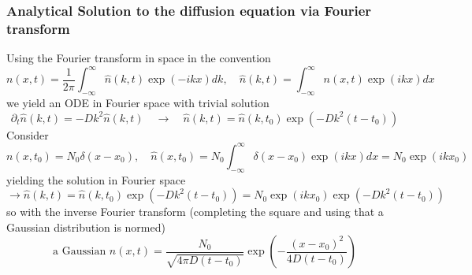 \subsubsection{Analytical Solution to the diffusion equation via Fourier transform}
Using the Fourier transform in space in the convention
\begin{equation}
    n(x, t)=\frac{1}{2 \pi} \int_{-\infty}^{\infty} \hat{n}(k, t) \exp (-i k x) d k, \quad \hat{n}(k, t)=\int_{-\infty}^{\infty} n(x, t) \exp (i k x) d x
\end{equation}
we yield an ODE in Fourier space with trivial solution
\begin{equation}
    \partial_t \hat{n}(k, t)=-D k^2 \hat{n}(k, t) \quad \rightarrow \quad \hat{n}(k, t)=\hat{n}\left(k, t_0\right) \exp \left(-D k^2\left(t-t_0\right)\right)
\end{equation}
Consider
\begin{equation}
    n\left(x, t_0\right)=N_0 \delta\left(x-x_0\right), \quad \hat{n}\left(x, t_0\right)=N_0 \int_{-\infty}^{\infty} \delta\left(x-x_0\right) \exp (i k x) d x=N_0 \exp \left(i k x_0\right)
\end{equation}
yielding the solution in Fourier space
\begin{equation}
    \rightarrow \hat{n}(k, t)=\hat{n}\left(k, t_0\right) \exp \left(-D k^2\left(t-t_0\right)\right)=N_0 \exp \left(i k x_0\right) \exp \left(-D k^2\left(t-t_0\right)\right)
\end{equation}
so with the inverse Fourier transform (completing the square and using that a Gaussian distribution is normed)
\begin{equation}
    \text{a Gaussian } n(x, t)=\frac{N_0}{\sqrt{4 \pi D\left(t-t_0\right)}} \exp \left(-\frac{\left(x-x_0\right)^2}{4 D\left(t-t_0\right)}\right)
\end{equation}

